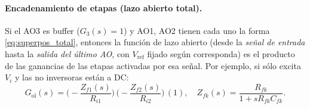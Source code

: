 \paragraph{Encadenamiento de etapas (lazo abierto total).}
Si el AO3 es buffer ($G_3(s)=1$) y AO1, AO2 tienen cada uno la forma \eqref{eq:superpos_total}, entonces la función de lazo abierto (desde la \emph{señal de entrada} hasta la \emph{salida del último AO}, con $V_{\text{ref}}$ fijado según corresponda) es el producto de las ganancias de las etapas activadas por esa señal. Por ejemplo, si sólo excita $V_i$ y las no inversoras están a DC:
\[
G_{\text{ol}}(s)
= \Big(-\frac{Z_{f1}(s)}{R_{i1}}\Big)\,
\Big(-\frac{Z_{f2}(s)}{R_{i2}}\Big)\,
(1),
\quad
Z_{fk}(s)=\frac{R_{fk}}{1+sR_{fk}C_{fk}}.
\]
